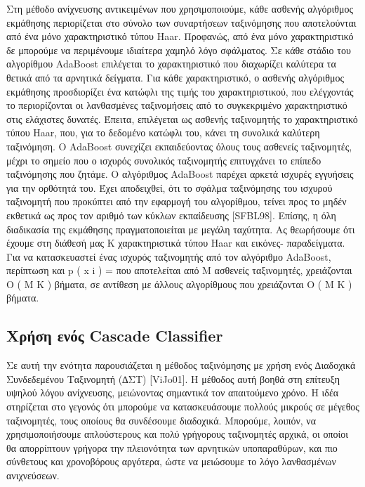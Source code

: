 Στη μέθοδο ανίχνευσης αντικειμένων που χρησιμοποιούμε, κάθε ασθενής αλγόριθμος
εκμάθησης περιορίζεται στο σύνολο των συναρτήσεων ταξινόμησης που αποτελούνται από ένα
μόνο χαρακτηριστικό τύπου Haar. Προφανώς, από ένα μόνο χαρακτηριστικό δε μπορούμε να
περιμένουμε ιδιαίτερα χαμηλό λόγο σφάλματος. Σε κάθε στάδιο του αλγορίθμου AdaBoost
επιλέγεται το χαρακτηριστικό που διαχωρίζει καλύτερα τα θετικά από τα αρνητικά δείγματα. Για
κάθε χαρακτηριστικό, ο ασθενής αλγόριθμος εκμάθησης προσδιορίζει ένα κατώφλι της τιμής του
χαρακτηριστικού, που ελέγχοντάς το περιορίζονται οι λανθασμένες ταξινομήσεις από το
συγκεκριμένο χαρακτηριστικό στις ελάχιστες δυνατές. Έπειτα, επιλέγεται ως ασθενής ταξινομητής
το χαρακτηριστικό τύπου Haar, που, για το δεδομένο κατώφλι του, κάνει τη συνολικά καλύτερη
ταξινόμηση. Ο AdaBoost συνεχίζει εκπαιδεύοντας όλους τους ασθενείς ταξινομητές, μέχρι το
σημείο που ο ισχυρός συνολικός ταξινομητής επιτυγχάνει το επίπεδο ταξινόμησης που ζητάμε.
Ο αλγόριθμος AdaBoost παρέχει αρκετά ισχυρές εγγυήσεις για την ορθότητά του. Έχει
αποδειχθεί, ότι το σφάλμα ταξινόμησης του ισχυρού ταξινομητή που προκύπτει από την εφαρμογή
του αλγορίθμου, τείνει προς το μηδέν εκθετικά ως προς τον αριθμό των κύκλων εκπαίδευσης
[SFBL98]. Επίσης, η όλη διαδικασία της εκμάθησης πραγματοποιείται με μεγάλη ταχύτητα. Ας
θεωρήσουμε ότι έχουμε στη διάθεσή μας K χαρακτηριστικά τύπου Haar και
εικόνες-
παραδείγματα. Για να κατασκευαστεί ένας ισχυρός ταξινομητής από τον αλγόριθμο AdaBoost,
περίπτωση και p ( x i  ) =
που αποτελείται από M ασθενείς ταξινομητές, χρειάζονται O ( M K  ) βήματα, σε αντίθεση με
άλλους αλγορίθμους που χρειάζονται O ( M K
)
βήματα.

\subsection{Χρήση ενός Cascade Classifier}

Σε αυτή την ενότητα παρουσιάζεται η μέθοδος ταξινόμησης με χρήση ενός ∆ιαδοχικά
Συνδεδεμένου Ταξινομητή (∆ΣΤ) [ViJo01]. Η μέθοδος αυτή βοηθά στη επίτευξη υψηλού λόγου
ανίχνευσης, μειώνοντας σημαντικά τον απαιτούμενο χρόνο. Η ιδέα στηρίζεται στο γεγονός ότι
μπορούμε να κατασκευάσουμε πολλούς μικρούς σε μέγεθος ταξινομητές, τους οποίους θα
συνδέσουμε διαδοχικά. Μπορούμε, λοιπόν, να χρησιμοποιήσουμε απλούστερους και πολύ
γρήγορους ταξινομητές αρχικά, οι οποίοι θα απορρίπτουν γρήγορα την πλειονότητα των
αρνητικών υποπαραθύρων, και πιο σύνθετους και χρονοβόρους αργότερα, ώστε να μειώσουμε το
λόγο λανθασμένων ανιχνεύσεων.

